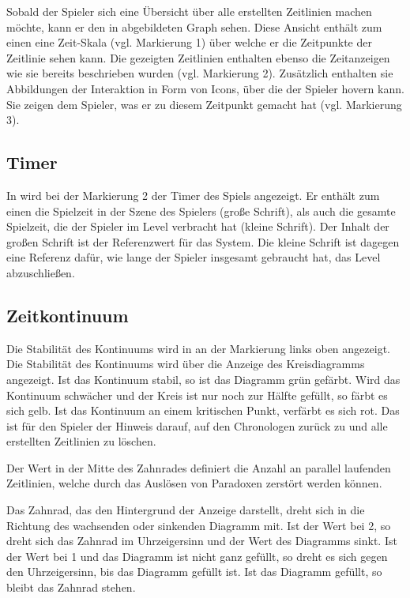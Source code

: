 Sobald der Spieler sich eine Übersicht über alle erstellten Zeitlinien machen möchte, kann er den in  abgebildeten Graph sehen. Diese Ansicht enthält zum einen eine Zeit-Skala (vgl. Markierung 1) über welche er die Zeitpunkte der Zeitlinie sehen kann. Die gezeigten Zeitlinien enthalten ebenso die Zeitanzeigen wie sie bereits beschrieben wurden (vgl. Markierung 2). Zusätzlich enthalten sie Abbildungen der Interaktion in Form von Icons, über die der Spieler hovern kann. Sie zeigen dem Spieler, was er zu diesem Zeitpunkt gemacht hat (vgl. Markierung 3).

\subsection{Timer}\label{sec:user_timer}
In  wird bei der Markierung 2 der Timer des Spiels angezeigt. Er enthält zum einen die Spielzeit in der Szene des Spielers (große Schrift), als auch die gesamte Spielzeit, die der Spieler im Level verbracht hat (kleine Schrift). Der Inhalt der großen Schrift ist der Referenzwert für das System. Die kleine Schrift ist dagegen eine Referenz dafür, wie lange der Spieler insgesamt gebraucht hat, das Level abzuschließen.
\subsection{Zeitkontinuum}\label{sec:kontinuum_ui}
Die Stabilität des Kontinuums wird in  an der Markierung links oben angezeigt. Die Stabilität des Kontinuums wird über die Anzeige des Kreisdiagramms angezeigt. Ist das Kontinuum stabil, so ist das Diagramm grün gefärbt. Wird das Kontinuum schwächer und der Kreis ist nur noch zur Hälfte gefüllt, so färbt es sich gelb. Ist das Kontinuum an einem kritischen Punkt, verfärbt es sich rot. Das ist für den Spieler der Hinweis darauf, auf den Chronologen zurück zu  und alle erstellten Zeitlinien zu löschen.

Der Wert in der Mitte des Zahnrades definiert die Anzahl an parallel laufenden Zeitlinien, welche durch das Auslösen von Paradoxen zerstört werden können.

Das Zahnrad, das den Hintergrund der Anzeige darstellt, dreht sich in die Richtung des wachsenden oder sinkenden Diagramm mit. Ist der Wert bei 2, so dreht sich das Zahnrad im Uhrzeigersinn und der Wert des Diagramms sinkt. Ist der Wert bei 1 und das Diagramm ist nicht ganz gefüllt, so dreht es sich gegen den Uhrzeigersinn, bis das Diagramm gefüllt ist. Ist das Diagramm gefüllt, so bleibt das Zahnrad stehen.

